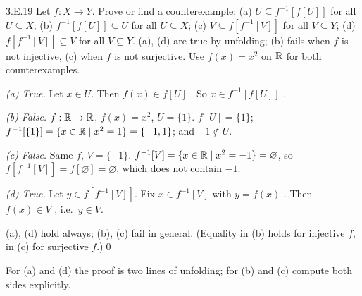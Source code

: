 \begin{bookex}[essential]{3.E.19}
Let $f:X\to Y$. Prove or find a counterexample: (a) $U\subseteq f^{-1}[f[U]]$ for all $U\subseteq X$; (b) $f^{-1}[f[U]]\subseteq U$ for all $U\subseteq X$; (c) $V\subseteq f[f^{-1}[V]]$ for all $V\subseteq Y$; (d) $f[f^{-1}[V]]\subseteq V$ for all $V\subseteq Y$.
\solution
\plan (a), (d) are true by unfolding; (b) fails when $f$ is not injective, (c) when $f$ is not surjective. Use $f(x)=x^2$ on $\mathbb{R}$ for both counterexamples.
\begin{steps}
\item \emph{(a) True.} Let $x\in U$. Then $f(x)\in f[U]$ . So $x\in f^{-1}[f[U]]$ .
\item \emph{(b) False.} $f:\mathbb{R}\to\mathbb{R}$, $f(x)=x^2$, $U=\{1\}$. $f[U]=\{1\}$; $f^{-1}[\{1\}]=\{x\in\mathbb{R}\mid x^2=1\}=\{-1,1\}$; and $-1\notin U$.
\item \emph{(c) False.} Same $f$, $V=\{-1\}$. $f^{-1}[V]=\{x\in\mathbb{R}\mid x^2=-1\}=\varnothing$, so $f[f^{-1}[V]]=f[\varnothing]=\varnothing$, which does not contain $-1$.
\item \emph{(d) True.} Let $y\in f[f^{-1}[V]]$. Fix $x\in f^{-1}[V]$ with $y=f(x)$ . Then $f(x)\in V$ , i.e.\ $y\in V$.
\end{steps}
\conclusion (a), (d) hold always; (b), (c) fail in general. (Equality in (b) holds for injective $f$, in (c) for surjective $f$.)\qed
\begin{compare}
\item For (a) and (d) the proof is two lines of unfolding; for (b) and (c) compute both sides explicitly.
\end{compare}
\end{bookex}

